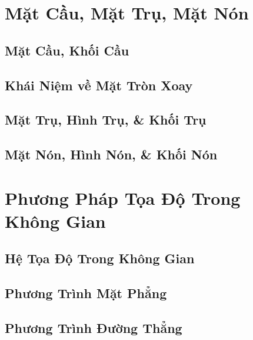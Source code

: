 \documentclass{article}
\numberwithin{equation}{section}
\begin{document}

\section{Mặt Cầu, Mặt Trụ, Mặt Nón}

\subsection{Mặt Cầu, Khối Cầu}


\subsection{Khái Niệm về Mặt Tròn Xoay}


\subsection{Mặt Trụ, Hình Trụ, \& Khối Trụ}


\subsection{Mặt Nón, Hình Nón, \& Khối Nón}


\section{Phương Pháp Tọa Độ Trong Không Gian}

\subsection{Hệ Tọa Độ Trong Không Gian}


\subsection{Phương Trình Mặt Phẳng}


\subsection{Phương Trình Đường Thẳng}


\printbibliography[heading=bibintoc]
	
\end{document}
